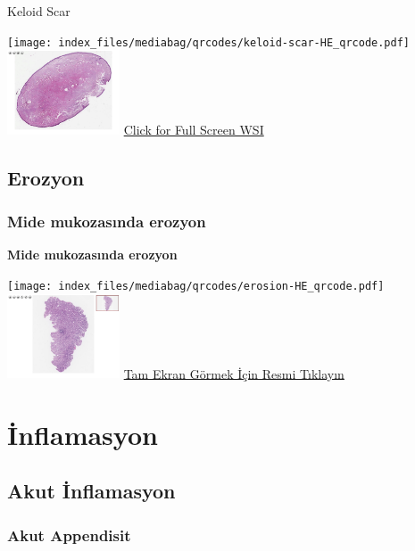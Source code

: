 \documentclass[
  letterpaper,
  DIV=11,
  numbers=noendperiod]{scrreprt}
\begin{document}
Keloid Scar

\texttt{[image: index\_files/mediabag/qrcodes/keloid-scar-HE\_qrcode.pdf]}
\href{https://images.patolojiatlasi.com/keloid-scar/HE.html}{\includegraphics[width=0.25\textwidth,height=\textheight]{./screenshots/thumbnail_keloid-scar.png}}
\href{https://images.patolojiatlasi.com/keloid-scar/HE.html}{Click for
Full Screen WSI}

\chapter{Erozyon}\label{sec-erozyon}

\section{Mide mukozasında erozyon}\label{sec-mide-mukozasinda-erozyon}

\textbf{Mide mukozasında erozyon}

\texttt{[image: index\_files/mediabag/qrcodes/erosion-HE\_qrcode.pdf]}
\href{https://images.patolojiatlasi.com/erosion/HE.html}{\includegraphics[width=0.25\textwidth,height=\textheight]{./screenshots/thumbnail_erosion.png}}
\href{https://images.patolojiatlasi.com/erosion/HE.html}{Tam Ekran
Görmek İçin Resmi Tıklayın}

\part{İnflamasyon}

\chapter{Akut İnflamasyon}\label{sec-akut-inflamasyon}

\section{Akut Appendisit}\label{sec-akut-appendisit}
\end{document}
